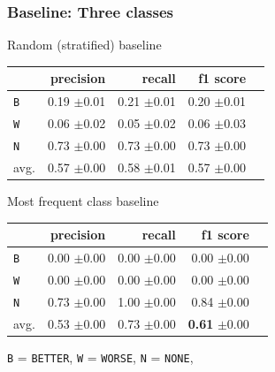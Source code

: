 \documentclass[11pt,aspectratio=169,usenames,dvipsnames]{beamer}
\begin{document}
    \begin{frame}[t]
        \frametitle{Baseline: Three classes}

        \begin{minipage}{.5\linewidth}
            \label{tbl:3stratifiedbaseline}
            \centering
            Random (stratified) baseline\newline\newline
            \begin{tabularx}{0.97\linewidth}{Xrrrr}
                \toprule
                & precision & recall & f1 score                     \\ \midrule
                \texttt{B} & 0.19 \scriptsize{$\pm$0.01} & 0.21 \scriptsize{$\pm$0.01} & 0.20 \scriptsize{$\pm$0.01} \\
                \texttt{W}  & 0.06 \scriptsize{$\pm$0.02} & 0.05 \scriptsize{$\pm$0.02} & 0.06 \scriptsize{$\pm$0.03} \\
                \texttt{N}   & 0.73 \scriptsize{$\pm$0.00}  & 0.73 \scriptsize{$\pm$0.00} & 0.73 \scriptsize{$\pm$0.00} \\
                avg. & 0.57 \scriptsize{$\pm$0.00} & 0.58 \scriptsize{$\pm$0.01} & 0.57 \scriptsize{$\pm$0.00} \\
                \bottomrule
            \end{tabularx}

        \end{minipage}%
        \begin{minipage}{.5\linewidth}
            \centering
            Most frequent class baseline\newline\newline
            \begin{tabularx}{0.97\linewidth}{Xrrrr}
                \toprule
                & precision & recall & f1 score                                    \\ \midrule
                \texttt{B} & 0.00 \scriptsize{$\pm$0.00} & 0.00 \scriptsize{$\pm$0.00} & 0.00 \scriptsize{$\pm$0.00}                \\
                \texttt{W}  & 0.00 \scriptsize{$\pm$0.00} & 0.00 \scriptsize{$\pm$0.00} & 0.00 \scriptsize{$\pm$0.00}                \\
                \texttt{N}   & 0.73 \scriptsize{$\pm$0.00}     & 1.00 \scriptsize{$\pm$0.00} & 0.84 \scriptsize{$\pm$0.00}                \\
                avg. & 0.53 \scriptsize{$\pm$0.00} & 0.73 \scriptsize{$\pm$0.00} & \textbf{0.61} \scriptsize{$\pm$0.00} \\
                \bottomrule
            \end{tabularx}
        \end{minipage}\newline\newline
        \texttt{B} = \texttt{BETTER}, \texttt{W} = \texttt{WORSE}, \texttt{N} = \texttt{NONE},
    \end{frame}
\end{document}
